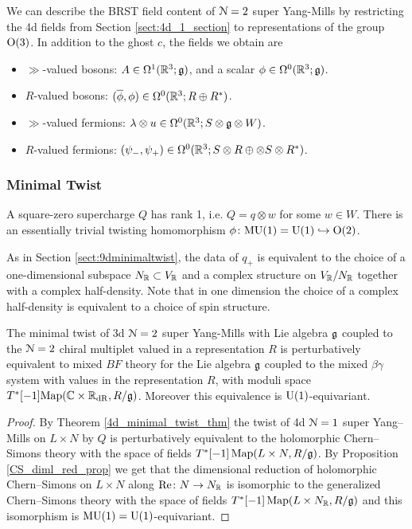 \documentclass[10pt, oneside]{article}
\newcommand{\MU}{\mathrm{MU}}
\renewcommand{\Re}{\mathrm{Re}}
\renewcommand{\U}{\mathrm{U}}
\begin{document}
We can describe the BRST field content of $\mathcal{N}=2$ super Yang-Mills by restricting the 4d fields from Section \ref{sect:4d_1_section} to representations of the group $\mathrm{O}(3)$.  In addition to the ghost $c$, the fields we obtain are
\begin{itemize}
 \item $\gg$-valued bosons: $A \in \Omega^1(\mathbb R^3; \mathfrak{g})$, and a scalar $\phi \in \Omega^0(\mathbb R^3; \mathfrak{g})$.
 \item $R$-valued bosons: $(\overline{\phi}, \phi) \in \Omega^0(\mathbb R^3 ; R \oplus R^*)$.
 \item $\gg$-valued fermions: $\lambda \otimes u \in \Omega^0(\mathbb R^3 ; S \otimes \mathfrak{g} \otimes W)$.
 \item $R$-valued fermions: $(\psi_-,\psi_+) \in \Omega^0(\mathbb R^3 ; S \otimes R \oplus \otimes S \otimes R^*)$.
\end{itemize}

\subsubsection{Minimal Twist}
\label{sect:3dminimaltwist}
A square-zero supercharge $Q$ has rank 1, i.e. $Q = q \otimes w$ for some $w \in W$.  There is an essentially trivial twisting homomorphism $\phi \colon \MU(1) = \U(1)\hookrightarrow \mr O(2)$.

As in Section \ref{sect:9dminimaltwist}, the data of $q_+$ is equivalent to the choice of a one-dimensional subspace $N_\mathbb R\subset V_\mathbb R$ and a complex structure on $V_\mathbb R/N_\mathbb R$ together with a complex half-density.  Note that in one dimension the choice of a complex half-density is equivalent to a choice of spin structure.

\begin{theorem} \label{3d_minimal_twist_thm}
The minimal twist of 3d $\mathcal N=2$ super Yang-Mills with Lie algebra $\mathfrak g$ coupled to the $\mathcal N=2$ chiral multiplet valued in a representation $R$ is perturbatively equivalent to mixed $BF$ theory for the Lie algebra $\mathfrak g$ coupled to the mixed $\beta\gamma$ system with values in the representation $R$, with moduli space $T^*[-1]\mathrm{Map}(\mathbb C \times \mathbb R_{\mathrm{dR}}, R/\mathfrak{g})$. Moreover this equivalence is $\mathrm{U}(1)$-equivariant.
\end{theorem}

\begin{proof}
By Theorem \ref{4d_minimal_twist_thm} the twist of 4d $\mathcal N=1$ super Yang--Mills on $L\times N$ by $Q$ is perturbatively equivalent to the holomorphic Chern--Simons theory with the space of fields $T^*[-1]\operatorname{Map}(L\times N, R / \mathfrak g)$. By Proposition \ref{CS_diml_red_prop} we get that the dimensional reduction of holomorphic Chern--Simons on $L\times N$ along $\Re\colon N\rightarrow N_\RR$ is isomorphic to the generalized Chern--Simons theory with the space of fields $T^*[-1]\operatorname{Map}(L\times N_\mathbb R, R/\mathfrak g)$ and this isomorphism is $\MU(1) = \mr U(1)$-equivariant.
\end{proof}
\end{document}
